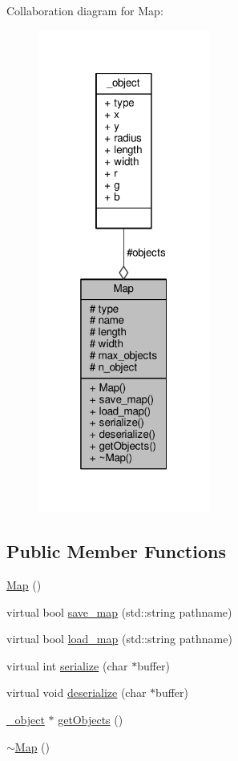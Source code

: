 Collaboration diagram for Map\+:\nopagebreak
\begin{figure}[H]
\begin{center}
\leavevmode
\includegraphics[width=160pt]{class_map__coll__graph}
\end{center}
\end{figure}
\subsection*{Public Member Functions}
\begin{DoxyCompactItemize}
\item 
\hyperlink{class_map_a0f5ad0fd4563497b4214038cbca8b582}{Map} ()
\item 
virtual bool \hyperlink{class_map_afdd22d2739acb6a6eaf8864ee090107a}{save\+\_\+map} (std\+::string pathname)
\item 
virtual bool \hyperlink{class_map_a259bb70652389b9ecf0bc76ceca656a5}{load\+\_\+map} (std\+::string pathname)
\item 
virtual int \hyperlink{class_map_ac85777e48836aa23c8c7adac7ea50ea8}{serialize} (char $\ast$buffer)
\item 
virtual void \hyperlink{class_map_a958dfc5b0956b8a4cb1ac03b0ccfdce8}{deserialize} (char $\ast$buffer)
\item 
\hyperlink{struct__object}{\+\_\+object} $\ast$ \hyperlink{class_map_a3e692a4d7e5ce0687bf4b93254714edf}{get\+Objects} ()
\item 
\hyperlink{class_map_aa403fbe09394ccf39747588f5168e3b2}{$\sim$\+Map} ()
\end{DoxyCompactItemize}
